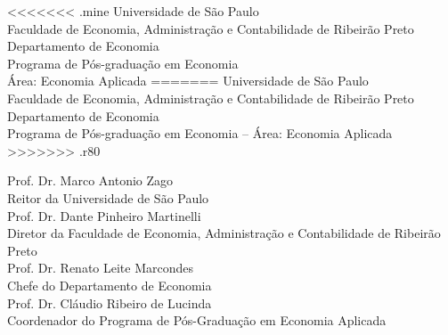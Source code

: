 \documentclass[
	12pt,				%
	openright,			%
	oneside,			%
	a4paper,			%
	english,			%
	french,				%
	spanish,			%
	brazil,				%
	]{abntex2}
\renewcommand{\imprimircapa}{%
  \begin{capa}%
    \center
<<<<<<< .mine
    \ABNTEXchapterfont\Large Universidade de São Paulo \\ Faculdade de Economia, Administração e Contabilidade de Ribeirão Preto \\ Departamento de Economia \\Programa de Pós-graduação em Economia \\ Área: Economia Aplicada
=======
    \ABNTEXchapterfont\Large Universidade de São Paulo \\ Faculdade de Economia, Administração e Contabilidade de Ribeirão Preto \\ Departamento de Economia \\Programa de Pós-graduação em Economia -- Área: Economia Aplicada
>>>>>>> .r80
    
    \vspace*{1cm}
    
    \vfill


    \ABNTEXchapterfont\bfseries\LARGE\imprimirtitulo
    \vfill
	{\raggedleft{\small\imprimirorientadorRotulo~\imprimirorientador}\par}
	\vfill
    \centering\large\imprimirlocal

    \centering\large\imprimirdata
    
    \vspace*{1cm}
  \end{capa}
  }
\begin{document}
	\frenchspacing 
	\pretextual
	\imprimircapa
	\null
	\vfill
	\begin{center}
	\large{Prof. Dr. Marco Antonio Zago}\\
	Reitor da Universidade de São Paulo\\
	\phantom{}
	\large{Prof. Dr. Dante Pinheiro Martinelli}\\
	Diretor da Faculdade de Economia, Administração e Contabilidade de Ribeirão Preto\\
	\phantom{}
	\large{Prof. Dr. Renato Leite Marcondes}\\
	Chefe do Departamento de Economia \\
	\phantom{}
	\large{Prof. Dr. Cláudio Ribeiro de Lucinda}\\
	Coordenador do Programa de Pós-Graduação em Economia Aplicada
	\end{center}
	\imprimirfolhaderosto*
	
\end{document}
